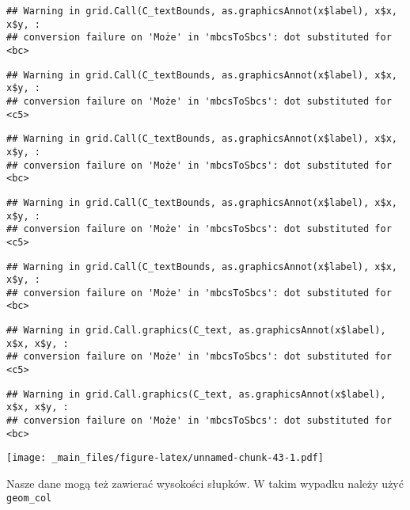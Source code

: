 \documentclass[
]{book}
\begin{document}
\begin{verbatim}
## Warning in grid.Call(C_textBounds, as.graphicsAnnot(x$label), x$x, x$y, :
## conversion failure on 'Może' in 'mbcsToSbcs': dot substituted for <bc>
\end{verbatim}

\begin{verbatim}
## Warning in grid.Call(C_textBounds, as.graphicsAnnot(x$label), x$x, x$y, :
## conversion failure on 'Może' in 'mbcsToSbcs': dot substituted for <c5>
\end{verbatim}

\begin{verbatim}
## Warning in grid.Call(C_textBounds, as.graphicsAnnot(x$label), x$x, x$y, :
## conversion failure on 'Może' in 'mbcsToSbcs': dot substituted for <bc>
\end{verbatim}

\begin{verbatim}
## Warning in grid.Call(C_textBounds, as.graphicsAnnot(x$label), x$x, x$y, :
## conversion failure on 'Może' in 'mbcsToSbcs': dot substituted for <c5>
\end{verbatim}

\begin{verbatim}
## Warning in grid.Call(C_textBounds, as.graphicsAnnot(x$label), x$x, x$y, :
## conversion failure on 'Może' in 'mbcsToSbcs': dot substituted for <bc>
\end{verbatim}

\begin{verbatim}
## Warning in grid.Call.graphics(C_text, as.graphicsAnnot(x$label), x$x, x$y, :
## conversion failure on 'Może' in 'mbcsToSbcs': dot substituted for <c5>
\end{verbatim}

\begin{verbatim}
## Warning in grid.Call.graphics(C_text, as.graphicsAnnot(x$label), x$x, x$y, :
## conversion failure on 'Może' in 'mbcsToSbcs': dot substituted for <bc>
\end{verbatim}

\texttt{[image: \_main\_files/figure-latex/unnamed-chunk-43-1.pdf]}

Nasze dane mogą też zawierać wysokości słupków. W takim wypadku należy użyć \texttt{geom\_col}
\end{document}
